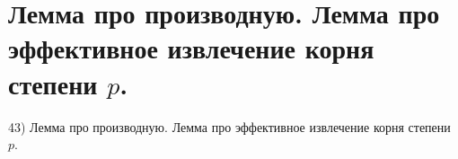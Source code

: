 \section{
 Лемма про производную. Лемма про эффективное извлечение корня степени $p$.
}

43) Лемма про производную. Лемма про эффективное извлечение корня степени $p$.
